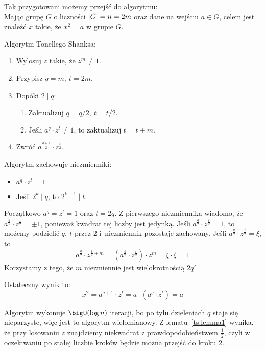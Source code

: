 \newpage
Tak przygotowani możemy przejść do algorytmu: \\
Mając grupę \( G \) o liczności \( \left\lvert G\right\rvert = n = 2m \) oraz dane na wejściu \( a \in G \), celem jest znaleźć \( x \) takie, że \( x^2 = a \) w grupie \( G \).
\begin{greyframe}
    Algorytm Tonellego-Shanksa:
    \begin{enumerate}
        \item Wylosuj \( z \) takie, że \( z^m \neq 1 \).
        \item Przypisz \( q = m, \ t = 2m \).
        \item Dopóki \( 2 \mid q \):
        \begin{enumerate}
            \item Zaktualizuj \( q = q / 2, \ t = t / 2 \).
            \item Jeśli \( a^q \cdot z^t \neq 1 \), to zaktualizuj \( t = t + m \).
        \end{enumerate}
        \item Zwróć \( a^{\frac{q+1}{2}} \cdot z^{\frac{t}{2}} \).
    \end{enumerate}
\end{greyframe}
Algorytm zachowuje niezmienniki:
\begin{itemize}
    \item \( a^q \cdot z^t = 1 \)
    \item Jeśli \( 2^k \mid q \), to \( 2^{k+1} \mid t \).
\end{itemize}
Początkowo \(a^q = z^t = 1 \) oraz \( t = 2q \).
Z pierwszego niezmiennika wiadomo, że \( a^{\frac{q}{2}} \cdot z^{\frac{t}{2}} = \pm 1 \), ponieważ kwadrat tej liczby jest jedynką.
Jeśli \( a^{\frac{q}{2}} \cdot z^{\frac{t}{2}} = 1 \), to możemy podzielić \( q, \ t \) przez 2 i~niezmiennik pozostaje zachowany.
Jeśli \( a^{\frac{q}{2}} \cdot z^{\frac{t}{2}} = \xi \), to
\[
    a^{\frac{q}{2}} \cdot z^{\frac{t}{2} + m} = (a^{\frac{q}{2}} \cdot z^{\frac{t}{2}}) \cdot z^m = \xi \cdot \xi = 1
\]
Korzystamy z tego, że \( m \) niezmiennie jest wielokrotnością \( 2q' \).

Ostateczny wynik to:
\[
    x^2 = a^{q+1} \cdot z^t = a \cdot (a^q \cdot z^t) = a
\]

Algorytm wykonuje \( \bigO(\log n) \) iteracji, bo po tylu dzieleniach \( q \) staje się nieparzyste, więc jest to algorytm wielomianowy.
Z lematu~\ref{ts:lemma1} wynika, że przy losowaniu \( z \) znajdziemy niekwadrat z prawdopodobieństwem \( \frac{1}{2} \), czyli w oczekiwaniu po stałej liczbie kroków będzie można przejść do kroku 2.